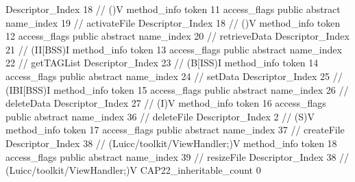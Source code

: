 {{{{{					Descriptor_Index	18		// ()V
				}
				method_info {
					token	11
					access_flags	public abstract
					name_index	19		// activateFile
					Descriptor_Index	18		// ()V
				}
				method_info {
					token	12
					access_flags	public abstract
					name_index	20		// retrieveData
					Descriptor_Index	21		// (II[BSS)I
				}
				method_info {
					token	13
					access_flags	public abstract
					name_index	22		// getTAGList
					Descriptor_Index	23		// (B[ISS)I
				}
				method_info {
					token	14
					access_flags	public abstract
					name_index	24		// setData
					Descriptor_Index	25		// (IBI[BSS)I
				}
				method_info {
					token	15
					access_flags	public abstract
					name_index	26		// deleteData
					Descriptor_Index	27		// (I)V
				}
				method_info {
					token	16
					access_flags	public abstract
					name_index	36		// deleteFile
					Descriptor_Index	2		// (S)V
				}
				method_info {
					token	17
					access_flags	public abstract
					name_index	37		// createFile
					Descriptor_Index	38		// (Luicc/toolkit/ViewHandler;)V
				}
				method_info {
					token	18
					access_flags	public abstract
					name_index	39		// resizeFile
					Descriptor_Index	38		// (Luicc/toolkit/ViewHandler;)V
				}
			}
			CAP22_inheritable_count	0
		}
	}
}
